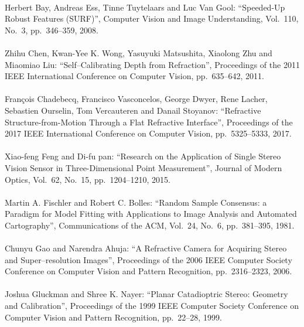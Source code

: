 \begin{mythebibliography}{}
\leavevmode \\Herbert Bay, Andreas Ess, Tinne Tuytelaars and Luc Van Gool:
\newblock ``Speeded-Up Robust Features (SURF)'',
\newblock Computer Vision and Image Understanding, Vol.~110, No.~3, pp.~346--359, 2008.
\\

\leavevmode \\Zhihu Chen, Kwan-Yee K. Wong, Yasuyuki Matsushita, Xiaolong Zhu and Miaomiao Liu:
\newblock ``Self--Calibrating Depth from Refraction'',
\newblock Proceedings of the 2011 IEEE International Conference on Computer Vision, pp.~635--642, 2011.
\\

\leavevmode \\François Chadebecq, Francisco Vasconcelos, George Dwyer, Rene Lacher, Sebastien Ourselin, Tom Vercauteren and Danail Stoyanov:
\newblock ``Refractive Structure-from-Motion Through a Flat Refractive Interface'',
\newblock Proceedings of the 2017 IEEE International Conference on Computer Vision, pp.~5325--5333, 2017.
\\

\leavevmode \\Xiao-feng Feng and Di-fu pan:
\newblock ``Research on the Application of Single Stereo Vision Sensor in Three-Dimensional Point Measurement'',
\newblock Journal of Modern Optics, Vol.~62, No.~15, pp.~1204--1210, 2015.
\\

\leavevmode \\Martin A. Fischler and Robert C. Bolles:
\newblock ``Random Sample Consensus: a Paradigm for Model Fitting with Applications to Image Analysis and Automated Cartography'',
\newblock Communications of the ACM, Vol.~24, No.~6, pp.~381--395, 1981.
\\

\leavevmode \\Chunyu Gao and Narendra Ahuja:
\newblock ``A Refractive Camera for Acquiring Stereo and Super--resolution Images'',
\newblock Proceedings of the 2006 IEEE Computer Society Conference on Computer Vision and Pattern Recognition, pp.~2316--2323, 2006.
\\

\leavevmode \\Joshua Gluckman and Shree K. Nayer:
\newblock ``Planar Catadioptric Stereo: Geometry and Calibration'',
\newblock  Proceedings of the 1999 IEEE Computer Society Conference on Computer Vision and Pattern Recognition, pp.~22--28, 1999.
\\


\end{mythebibliography}
